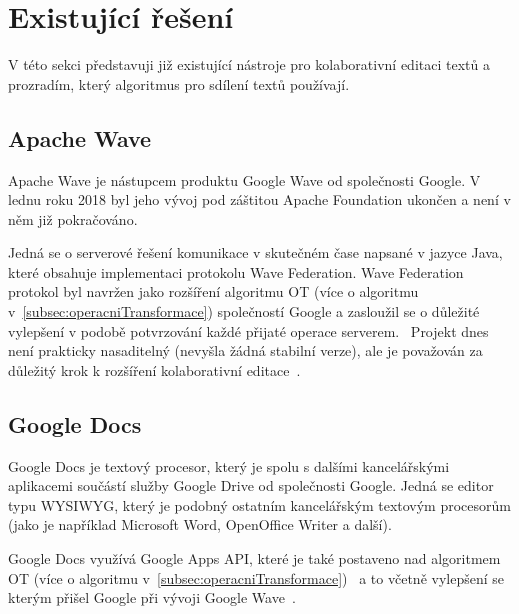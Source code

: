 
\section{Existující řešení}\label{sec:existujícíŘešení}
V této sekci představuji již existující nástroje pro kolaborativní editaci textů a prozradím, který algoritmus pro sdílení textů používají.

\subsection{Apache Wave}\label{subsec:apacheWave}
Apache Wave je nástupcem produktu Google Wave od společnosti Google.
V lednu roku 2018 byl jeho vývoj pod záštitou Apache Foundation ukončen a není v něm již pokračováno.~\cite{wave:apache}

Jedná se o serverové řešení komunikace v skutečném čase napsané v jazyce Java, které obsahuje implementaci protokolu Wave Federation.
Wave Federation protokol byl navržen jako rozšíření algoritmu \gls{OT} (více o algoritmu v~\ref{subsec:operacniTransformace}) společností Google a zasloužil se o důležité vylepšení v podobě potvrzování každé přijaté operace serverem.~\cite{wave:apache, wave:google}
Projekt dnes není prakticky nasaditelný (nevyšla žádná stabilní verze), ale je považován za důležitý krok k rozšíření kolaborativní editace~\cite{ot:codecommit}.

\subsection{Google Docs}\label{subsec:googleDocs}
Google Docs je textový procesor, který je spolu s dalšími kancelářskými aplikacemi součástí služby Google Drive od společnosti Google.
Jedná se editor typu \gls{WYSIWYG}, který je podobný ostatním kancelářským textovým procesorům (jako je například Microsoft Word, OpenOffice Writer a další).~\cite{docs:top10}

Google Docs využívá Google Apps API, které je také postaveno nad algoritmem \gls{OT} (více o algoritmu v~\ref{subsec:operacniTransformace})~\cite{docs:conflict} a to včetně vylepšení se kterým přišel Google při vývoji Google Wave~\cite{docs:appsConf}.

